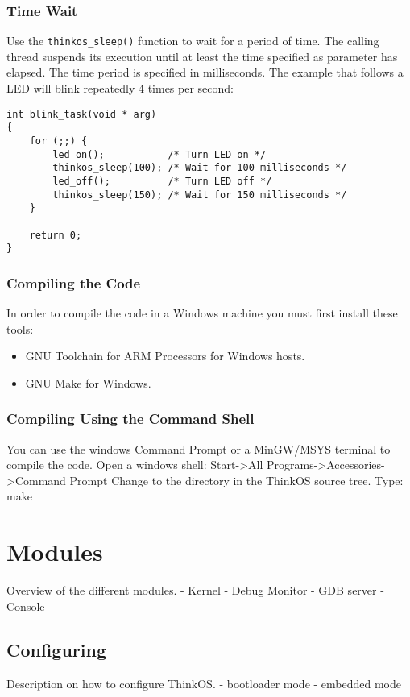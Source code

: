 \subsubsection{Time Wait}

Use the \lstinline{thinkos_sleep()} function to wait for a period of time. The calling thread suspends its execution until at least the time specified as parameter has elapsed. The time period is specified in milliseconds.
The example that follows a LED will blink repeatedly 4 times per second:

\begin{lstlisting}[caption={Time Wait Example},label={lst:example4},language=C99,frame=single]
int blink_task(void * arg)
{
    for (;;) {
        led_on();           /* Turn LED on */
        thinkos_sleep(100); /* Wait for 100 milliseconds */
        led_off();          /* Turn LED off */
        thinkos_sleep(150); /* Wait for 150 milliseconds */
    }

    return 0;
}
\end{lstlisting}

\subsubsection{Compiling the Code}

In order to compile the code in a Windows machine you must first install these tools:
\begin{itemize}
\item GNU Toolchain for ARM Processors for Windows hosts.
\item GNU Make for Windows.
\end{itemize}

\subsubsection{Compiling Using the Command Shell}

You can use the windows Command Prompt or a MinGW/MSYS terminal to compile the code.
Open a windows shell: Start->All Programs->Accessories->Command Prompt
Change to the directory  in the ThinkOS source tree.
Type: make

\section{Modules}
 Overview of the different modules.
 - Kernel
 - Debug Monitor
 - GDB server
 - Console

\subsection{Configuring}
 Description on how to configure ThinkOS.
 - bootloader mode
 - embedded mode

